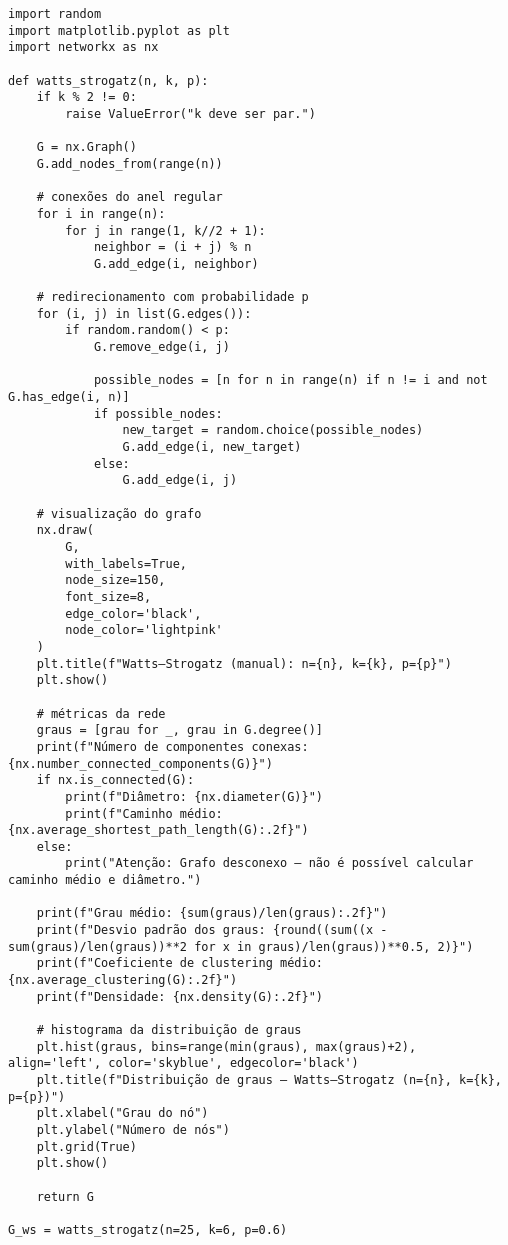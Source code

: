 \documentclass{article}
\begin{document}
\begin{verbatim}
import random
import matplotlib.pyplot as plt
import networkx as nx

def watts_strogatz(n, k, p):
    if k % 2 != 0:
        raise ValueError("k deve ser par.")

    G = nx.Graph()
    G.add_nodes_from(range(n))

    # conexões do anel regular
    for i in range(n):
        for j in range(1, k//2 + 1):
            neighbor = (i + j) % n
            G.add_edge(i, neighbor)

    # redirecionamento com probabilidade p
    for (i, j) in list(G.edges()):
        if random.random() < p:
            G.remove_edge(i, j)

            possible_nodes = [n for n in range(n) if n != i and not G.has_edge(i, n)]
            if possible_nodes:
                new_target = random.choice(possible_nodes)
                G.add_edge(i, new_target)
            else:
                G.add_edge(i, j)

    # visualização do grafo
    nx.draw(
        G,
        with_labels=True,
        node_size=150,
        font_size=8,
        edge_color='black',
        node_color='lightpink'
    )
    plt.title(f"Watts–Strogatz (manual): n={n}, k={k}, p={p}")
    plt.show()

    # métricas da rede
    graus = [grau for _, grau in G.degree()]
    print(f"Número de componentes conexas: {nx.number_connected_components(G)}")
    if nx.is_connected(G):
        print(f"Diâmetro: {nx.diameter(G)}")
        print(f"Caminho médio: {nx.average_shortest_path_length(G):.2f}")
    else:
        print("Atenção: Grafo desconexo – não é possível calcular caminho médio e diâmetro.")

    print(f"Grau médio: {sum(graus)/len(graus):.2f}")
    print(f"Desvio padrão dos graus: {round((sum((x - sum(graus)/len(graus))**2 for x in graus)/len(graus))**0.5, 2)}")
    print(f"Coeficiente de clustering médio: {nx.average_clustering(G):.2f}")
    print(f"Densidade: {nx.density(G):.2f}")

    # histograma da distribuição de graus
    plt.hist(graus, bins=range(min(graus), max(graus)+2), align='left', color='skyblue', edgecolor='black')
    plt.title(f"Distribuição de graus — Watts–Strogatz (n={n}, k={k}, p={p})")
    plt.xlabel("Grau do nó")
    plt.ylabel("Número de nós")
    plt.grid(True)
    plt.show()

    return G

G_ws = watts_strogatz(n=25, k=6, p=0.6)

\end{verbatim}
\end{document}
